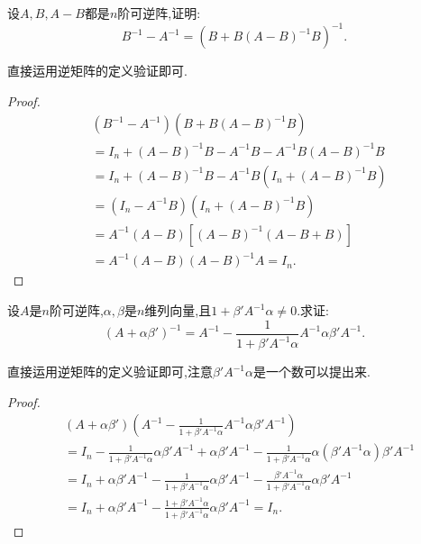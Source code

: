 \documentclass[../../main.tex]{subfiles}%
\begin{document}
\begin{proposition}\label{proposition:B^-1-A^-1用A和B表示}
设\(A,B,A - B\)都是\(n\)阶可逆阵,证明:
\[
B^{-1} - A^{-1} = (B + B(A - B)^{-1}B)^{-1}.
\]    
\end{proposition}
\begin{note}
直接运用逆矩阵的定义验证即可.
\end{note}
\begin{proof}

\begin{align*}
&\left( B^{-1}-A^{-1} \right) \left( B+B\left( A-B \right) ^{-1}B \right) 
\\
&=I_n+\left( A-B \right) ^{-1}B-A^{-1}B-A^{-1}B\left( A-B \right) ^{-1}B
\\
&=I_n+\left( A-B \right) ^{-1}B-A^{-1}B\left( I_n+\left( A-B \right) ^{-1}B \right) 
\\
&=\left( I_n-A^{-1}B \right) \left( I_n+\left( A-B \right) ^{-1}B \right) 
\\
&=A^{-1}\left( A-B \right) \left[ \left( A-B \right) ^{-1}\left( A-B+B \right) \right] 
\\
&=A^{-1}\left( A-B \right) \left( A-B \right) ^{-1}A=I_n.
\end{align*}

\end{proof}

\begin{proposition}\label{Sherman-Morrison公式}
设\(A\)是\(n\)阶可逆阵,\(\alpha,\beta\)是\(n\)维列向量,且\(1 + \beta'A^{-1}\alpha \neq 0\).求证:
\[
(A + \alpha\beta')^{-1} = A^{-1} - \frac{1}{1 + \beta'A^{-1}\alpha}A^{-1}\alpha\beta'A^{-1}.
\]
\end{proposition}
\begin{note}
直接运用逆矩阵的定义验证即可,注意$\beta'A^{-1}\alpha $是一个数可以提出来.
\end{note}
\begin{proof}

\begin{align*}
&\left( A+\alpha \beta ' \right) \left( A^{-1}-\frac{1}{1+\beta 'A^{-1}\alpha}A^{-1}\alpha \beta 'A^{-1} \right) 
\\
&=I_n-\frac{1}{1+\beta 'A^{-1}\alpha}\alpha \beta 'A^{-1}+\alpha \beta 'A^{-1}-\frac{1}{1+\beta 'A^{-1}\alpha}\alpha \left( \beta 'A^{-1}\alpha \right) \beta 'A^{-1}
\\
&=I_n+\alpha \beta 'A^{-1}-\frac{1}{1+\beta 'A^{-1}\alpha}\alpha \beta 'A^{-1}-\frac{\beta 'A^{-1}\alpha}{1+\beta 'A^{-1}\alpha}\alpha \beta 'A^{-1}
\\
&=I_n+\alpha \beta 'A^{-1}-\frac{1+\beta 'A^{-1}\alpha}{1+\beta 'A^{-1}\alpha}\alpha \beta 'A^{-1}=I_n.
\end{align*}

\end{proof}
\end{document}
